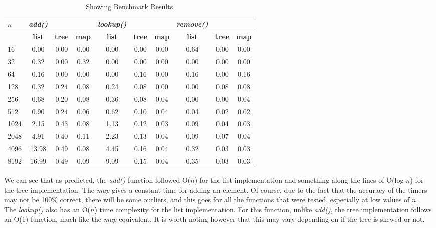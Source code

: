 \documentclass[a4paper,11pt]{article}
\begin{document}
\begin{table}[H]
\begin{center}
\caption{Showing Benchmark Results}
\label{tab:Table 1}
\begin{tabular}{|l|c|c|c|c|c|c|c|c|c|}
	\hline
\textbf{$n$} & \textit{add()} & & & \textit{lookup()} & &  & \textit{remove()} & &\\
	\hline
	  & \textbf{list} & \textbf{tree} & \textbf{map} & \textbf{list} & \textbf{tree} & \textbf{map} & \textbf{list} & \textbf{tree} & \textbf{map} \\
	  \hline
	16 & 0.00 & 0.00 & 0.00 & 0.00 & 0.00 & 0.00 & 0.64 & 0.00 & 0.00\\
	\hline
	32 & 0.32 & 0.00 & 0.32 & 0.00 & 0.00 & 0.00 & 0.00 & 0.00 & 0.00\\
      \hline
      64 & 0.16 & 0.00 & 0.00 & 0.00 & 0.16 & 0.00 & 0.16 & 0.00 & 0.16\\
      \hline
    128 & 0.32 & 0.24 & 0.08 & 0.24 & 0.08 & 0.00 & 0.00 & 0.08 & 0.08\\
 \hline   
    256 & 0.68 & 0.20 & 0.08 & 0.36 & 0.08 & 0.04 & 0.00 & 0.00 & 0.04\\
    \hline
    512 & 0.90 & 0.24 & 0.06 & 0.62 & 0.10 & 0.04 & 0.04 & 0.02 & 0.02\\
  \hline
  1024 & 2.15 & 0.43 & 0.08 & 1.13 & 0.12 & 0.03 & 0.09 & 0.04 & 0.03\\
  \hline
  2048 & 4.91 & 0.40 & 0.11 & 2.23 & 0.13 & 0.04 & 0.09 & 0.07 & 0.04\\
  \hline
  4096 & 13.98 & 0.49 & 0.08 & 4.45 & 0.16 & 0.04 & 0.32 & 0.03 & 0.03\\
  \hline
  8192 & 16.99 & 0.49 & 0.09 & 9.09 & 0.15 & 0.04 & 0.35 & 0.03 & 0.03\\
	\hline
\end{tabular}
\end{center}
\end{table}

We can see that as predicted, the \textit{add()} function followed O($n$) for the list implementation and something along the lines of O(log $n$) for the tree implementation. The \textit{map} gives a constant time for adding an element. Of course, due to the fact that the accuracy of the timers may not be 100\% correct, there will be some outliers, and this goes for all the functions that were tested, especially at low values of $n$.\\

 The \textit{lookup()} also has an O($n$) time complexity for the list implementation. For this function, unlike \textit{add()}, the tree implementation follows an O(1) function, much like the \textit{map} equivalent. It is worth noting however that this may vary depending on if the tree is skewed or not.\\
 
\end{document}
